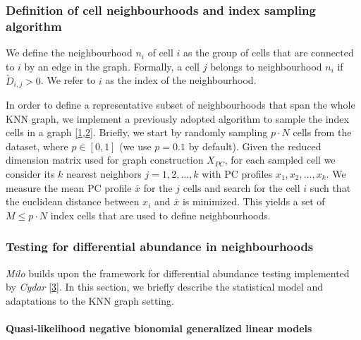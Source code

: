 \documentclass[
]{article}
\begin{document}
\hypertarget{definition-of-cell-neighbourhoods-and-index-sampling-algorithm}{%
\subsubsection{Definition of cell neighbourhoods and index sampling algorithm}\label{definition-of-cell-neighbourhoods-and-index-sampling-algorithm}}

We define the neighbourhood \(n_i\) of cell \(i\) as the group of cells that are connected to \(i\) by an edge in the graph.
Formally, a cell \(j\) belongs to neighbourhood \(n_i\) if \(\tilde{D}_{i,j} > 0\). We refer to \(i\) as the index of the neighbourhood.

In order to define a representative subset of neighbourhoods that span the whole KNN graph, we implement a previously adopted algorithm to sample the index cells in a graph {[}\protect\hyperlink{ref-gutTrajectoriesCellcycleProgression2015}{1},\protect\hyperlink{ref-settyWishboneIdentifiesBifurcating2016}{2}{]}.
Briefly, we start by randomly sampling \(p \cdot N\) cells from the dataset, where \(p \in [0,1]\) (we use \(p = 0.1\) by default).
Given the reduced dimension matrix used for graph construction \(X_{PC}\), for each sampled cell we consider its \(k\) nearest neighbors \(j = 1,2,...,k\) with PC profiles \({x_1, x_2, ... , x_k}\). We measure the mean PC profile \(\bar{x}\) for the \(j\) cells and search for the cell \(i\) such that the euclidean distance between \(x_i\) and \(\bar{x}\) is minimized. This yields a set of \(M \leq p \cdot N\) index cells that are used to define neighbourhoods.

\hypertarget{testing-for-differential-abundance-in-neighbourhoods}{%
\subsubsection{Testing for differential abundance in neighbourhoods}\label{testing-for-differential-abundance-in-neighbourhoods}}

\emph{Milo} builds upon the framework for differential abundance testing implemented by \emph{Cydar} {[}\protect\hyperlink{ref-lunTestingDifferentialAbundance2017}{3}{]}. In this section, we briefly describe the statistical model and adaptations to the KNN graph setting.

\hypertarget{quasi-likelihood-negative-bionomial-generalized-linear-models}{%
\paragraph*{Quasi-likelihood negative bionomial generalized linear models}\label{quasi-likelihood-negative-bionomial-generalized-linear-models}}
\end{document}
